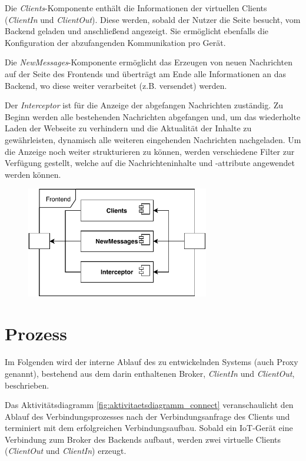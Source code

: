     Die \emph{Clients}-Komponente enthält die Informationen der virtuellen Clients (\emph{ClientIn} und \emph{ClientOut}). Diese werden, sobald der Nutzer die Seite besucht, vom Backend geladen und anschließend angezeigt. Sie ermöglicht ebenfalls die Konfiguration der abzufangenden Kommunikation pro Gerät.
    
    Die \emph{NewMessages}-Komponente ermöglicht das Erzeugen von neuen Nachrichten auf der Seite des Frontends und überträgt am Ende alle Informationen an das Backend, wo diese weiter verarbeitet (z.B. versendet) werden.
    
    Der \emph{Interceptor} ist für die Anzeige der abgefangen Nachrichten zuständig. Zu Beginn werden alle bestehenden Nachrichten abgefangen und, um das wiederholte Laden der Webseite zu verhindern und die Aktualität der Inhalte zu gewährleisten, dynamisch alle weiteren eingehenden Nachrichten nachgeladen. Um die Anzeige noch weiter strukturieren zu können, werden verschiedene Filter zur Verfügung gestellt, welche auf die Nachrichteninhalte und -attribute angewendet werden können.
    \begin{figure}[h]%
        \centering
        \includegraphics[width=8cm]{tex/bilder/4_konzept/Systemdiagramm_Konzept_Frontend.pdf}
        \label{fig:system_frontend}
    \end{figure}

\section{Prozess}
    Im Folgenden wird der interne Ablauf des zu entwickelnden Systems (auch Proxy genannt), bestehend aus dem darin enthaltenen Broker, \emph{ClientIn} und \emph{ClientOut}, beschrieben.

    Das Aktivitätsdiagramm \ref{fig:aktivitaetsdiagramm_connect} veranschaulicht den Ablauf des Verbindungsprozesses nach der Verbindungsanfrage des Clients und terminiert mit dem erfolgreichen Verbindungsaufbau.
    Sobald ein \ac{IoT}-Gerät eine Verbindung zum Broker des Backends aufbaut, werden zwei virtuelle Clients (\emph{ClientOut} und \emph{ClientIn}) erzeugt.
    
